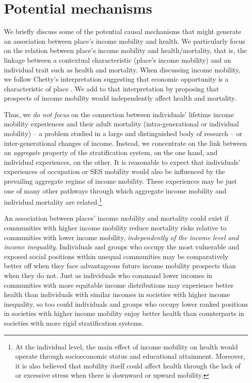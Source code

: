 \documentclass[class=article, crop=false, 12pt]{standalone}
\begin{document}
\section{Potential mechanisms} \label{ch04:theory}


We briefly discuss some of the potential causal mechanisms that might generate an association between place's income mobility and health. We particularly focus on the relation between place's income mobility and health/mortality, that is, the linkage between a contextual characteristic (place's income mobility) and an individual trait such as health and mortality. When discussing income mobility, we follow Chetty's interpretation suggesting that economic opportunity is a characteristic of place \citep{chetty2017}. We add to that interpretation by proposing that prospects of income mobility would independently affect health and mortality.

Thus, we \textit{do not focus} on the connection between individuals' lifetime income mobility experiences and their adult mortality (intra-generational or individual mobility) -- a problem studied in a large and distinguished body of research \citep{chandola2003, illsley1955, fox1982, blane1999} -- or inter-generational changes of income. Instead, we concentrate on the link between an \textit{aggregate} property of the stratification system, on the one hand, and individual experiences, on the other. It is reasonable to expect that individuals' experiences of occupation or SES mobility would also be influenced by the prevailing aggregate regime of income mobility. These experiences may be just one of many other pathways through which aggregate income mobility and individual mortality are related.\footnote{At the individual level, the main effect of income mobility on health would operate through socioeconomic status and educational attainment. Moreover, it is also believed that mobility itself could affect health through the lack of or excessive stress when there is downward or upward mobility.}

An association between places' income mobility and mortality could exist if communities with higher income mobility reduce mortality risks relative to communities with lower income mobility, \textit{independently of the income level and income inequality}. Individuals and groups who occupy the most vulnerable and exposed social positions within unequal communities may be comparatively better off when they face advantageous future income mobility prospects than when they do not. Just as individuals who command lower incomes in communities with more equitable income distributions may experience better health than individuals with similar incomes in societies with higher income inequality, so too could individuals and groups who occupy lower ranked positions in societies with higher income mobility enjoy better health than counterparts in societies with more rigid stratification systems.
\end{document}
